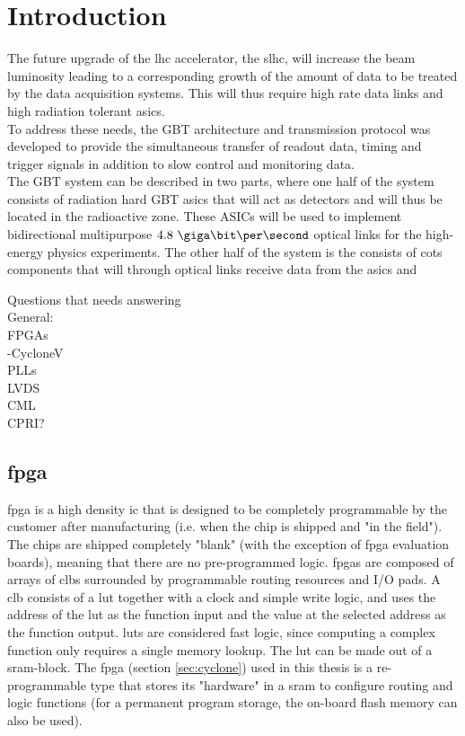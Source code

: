 \documentclass[main.tex]{subfiles}
\begin{document}
\chapter{Introduction}

The future upgrade of the \gls{lhc} accelerator, the \gls{slhc}, will increase the beam luminosity leading to a corresponding growth of the amount of data to be treated by the data acquisition systems. This will thus require high rate data links and high radiation tolerant \glspl{asic}.\\
To address these needs, the GBT architecture and transmission protocol was developed to provide the simultaneous transfer of readout data, timing and trigger signals in addition to slow control and monitoring data. \\
The GBT system can be described in two parts, where one half of the system consists of radiation hard GBT \glspl{asic} that will act as detectors and will thus be located in the radioactive zone. These ASICs will be used to implement bidirectional multipurpose $4.8\ \giga\bit\per\second$ optical links for the high-energy physics experiments. The other half of the system is the consists of \gls{cots} components that will through optical links receive data from the \glspl{asic} and 


Questions that needs answering\\
General:\\
FPGAs\\
-CycloneV\\
PLLs\\
LVDS\\
CML\\
CPRI?\\

\section{\gls{fpga}}

\Gls{fpga} is a high density \gls{ic} that is designed to be completely programmable by the customer after manufacturing (i.e. when the chip is shipped and "in the field"). The chips are shipped completely "blank" (with the exception of \gls{fpga} evaluation boards), meaning that there are no pre-programmed logic. \Glspl{fpga} are composed of arrays of \glspl{clb} surrounded by programmable routing resources and I/O pads. A \gls{clb} consists of a \gls{lut} together with a clock and simple write logic, and uses the address of the \gls{lut} as the function input and the value at the selected address as the function output. \glspl{lut} are considered fast logic, since computing a complex function only requires a single memory lookup. The \gls{lut} can be made out of a \gls{sram}-block. \cite{weste11} 
The \gls{fpga} (section \ref{sec:cyclone}) used in this thesis is a re-programmable type that stores its "hardware" in a \gls{sram} to configure routing and logic functions (for a permanent program storage, the on-board \gls{flash} memory can also be used).
\end{document}
